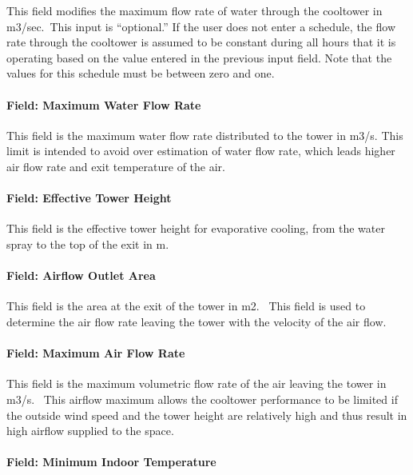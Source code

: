 This field modifies the maximum flow rate of water through the cooltower in m3/sec.~This input is ``optional.'' If the user does not enter a schedule, the flow rate through the cooltower is assumed to be constant during all hours that it is operating based on the value entered in the previous input field. Note that the values for this schedule must be between zero and one.

\paragraph{Field: Maximum Water Flow Rate}\label{field-maximum-water-flow-rate}

This field is the maximum water flow rate distributed to the tower in m3/s. This limit is intended to avoid over estimation of water flow rate, which leads higher air flow rate and exit temperature of the air.

\paragraph{Field: Effective Tower Height}\label{field-effective-tower-height}

This field is the effective tower height for evaporative cooling, from the water spray to the top of the exit in m.

\paragraph{Field: Airflow Outlet Area}\label{field-airflow-outlet-area}

This field is the area at the exit of the tower in m2. ~This field is used to determine the air flow rate leaving the tower with the velocity of the air flow.

\paragraph{Field: Maximum Air Flow Rate}\label{field-maximum-air-flow-rate-000}

This field is the maximum volumetric flow rate of the air leaving the tower in m3/s. ~This airflow maximum allows the cooltower performance to be limited if the outside wind speed and the tower height are relatively high and thus result in high airflow supplied to the space.

\paragraph{Field: Minimum Indoor Temperature}\label{field-minimum-indoor-temperature-2}

